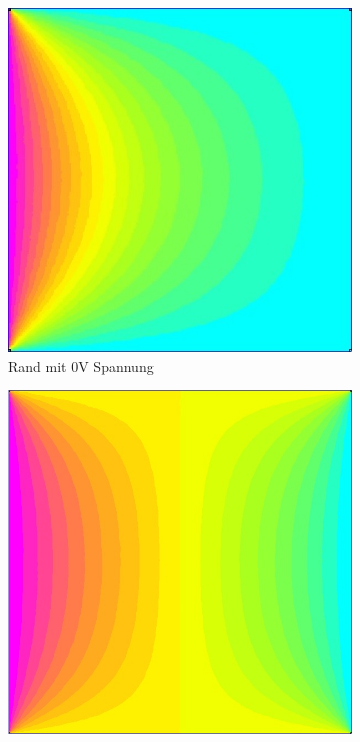 \begin{figure}[h]
	\begin{subfigure}[c]{0.32\textwidth}
		\includegraphics[width=\textwidth]{data/0VRandbedingung}
		\caption{Rand mit 0V Spannung}
		\label{fig:0V}
	\end{subfigure}
	\begin{subfigure}[c]{0.32\textwidth}
		\includegraphics[width=\textwidth]{data/0,5VRandbedingung}

\end{subfigure}
\end{figure}
